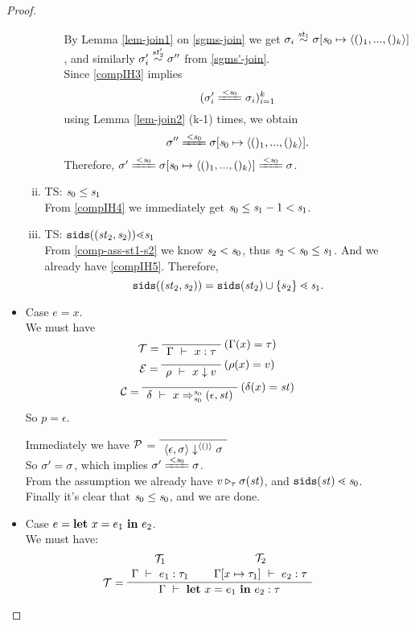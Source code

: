 \begin{proof}
\begin{itemize}
\begin{enumerate}[(i)]
\begin{itemize}
	By Lemma \ref{lem-join1} on \eqref{sgms-join} we get $\sgm_i \~{\st_1} \sgmsz$, and similarly $\sigma'_i \stackrel{\mathit{st}_2'}{\sim} \sigma''$ from \eqref{sgms'-join}. \\
	
	Since \eqref{compIH3} implies $$(\sgm'_i \ConEq{\s_0} \sgm_i)^k_{i=1}$$
	using Lemma \ref{lem-join2} (k-1) times, we obtain 
	$$\sgm'' \ConEq{\s_0} \sgmsz.$$
	Therefore, $\sgm' \ConEq{\s_0} \sgmsz \ConEq{\s_0} \sgm$.\\

	\end{itemize}

	\item TS: $\mathit{s}_0 \le \mathit{s}_1$ \\
	From \eqref{compIH4} we immediately get $\mathit{s}_0 \le \mathit{s}_1 -1 < \mathit{s}_1$.\\
	
	\item TS: $\sids{(\st_2,\s_2)} {\.<} \s_1$  \\
	From \eqref{comp-ass-st1-s2} we know $\mathit{s}_2 < \mathit{s}_0$, thus $ \mathit{s}_2 < \mathit{s}_0 \le \mathit{s}_1$. 
	And we already have \eqref{compIH5}. Therefore,
	$$\sids{(\st_2,\s_2)} = \sids{\st_2} \cup \{s_2\} \.< \s_1.$$
	
	\end{enumerate}

 \item Case $e = x$.\\
 We must have 
 $$\MT = \PT{
 	\AxiomC{}
 	\RiLa{(\Gam(x) = \tau)}
 	\UC{\Type{\Gam}{x}{\tau}}
 }$$
 $$ \ME = 
 \PT{
 	\AxiomC{}
 	\RiLa{(\rho(x)=v)}
 	\UC{\Eval{\rho}{x}{v}}
 }$$
 $$ \MC = 
 \PT{\AC{}
 	\RiLa{(\del(x)= \st)}
 	\UC{\Trans{\del}{x}{\s_0}{\s_0}{\sfun{\epsilon}{\st}}}
 }
 $$
 So $p= \epsilon$. 
 
 Immediately we have $\mathcal{P}$ =
 $\PT{\Axiom{\seval{\epsilon}{\sgm}{\vunit}{\sgm}}}$\\
 So $\sigma' = \sigma$, which implies $\sgm'  \ConEq{\s_0} \sgm$.\\
 From the assumption we already have $v \triangleright_{\tau} \sigma(\mathit{st})$,
 and $\sids{\st} \.< \s_0$. \\
 Finally it's clear that $\mathit{s}_0 \le \mathit{s}_0$, and we are done.
 
 
 \item \label{case-let} Case $e = \mathbf{let} \ x = e_1 \ \mathbf{in} \ e_2$. \\[1ex]
 We must have:
 $$\PT{
 	\UCN{\MT_1}{\Type{\Gam}{e_1}{\tau_1}}
 	\UCN{\MT_2}{\Type{\Gam[\Map{x}{\tau_1}]}{e_2}{\tau}}
 	\LeLa{\MT =} 
 	\BC{\Type{\Gam}{\Let{x}{e_1}{e_2}}{\tau}}
 }$$
 

\end{itemize}
\end{proof}
